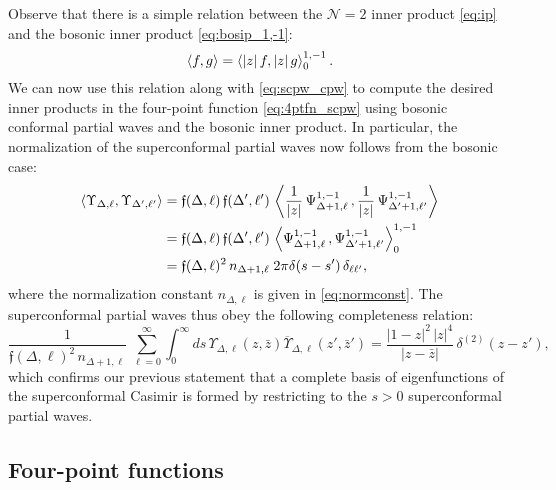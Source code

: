 \documentclass[11pt]{article}
\newcommand{\zb}{\bar{z}}
\begin{document}
Observe that there is a simple relation between the $\mathcal{N}=2$ inner product \eqref{eq:ip} and the bosonic inner product \eqref{eq:bosip_1,-1}:
%
\begin{equation}\label{eq:ipbos_rel}
\expval{ f,g } = \expval{ \abs{z}\, f, \abs{z}\, g }_{0}^{1,-1}.
\end{equation}
%
We can now use this relation along with \eqref{eq:scpw_cpw} to compute the desired inner products in the four-point function \eqref{eq:4ptfn_scpw} using bosonic conformal partial waves and the bosonic inner product. In particular, the normalization of the superconformal partial waves now follows from the bosonic case:
%
\begin{equation}\label{eq:scpw_norm}
\begin{split}
\expval{ \Upsilon_{\Delta,\ell},\Upsilon_{\Delta',\ell'} } 
&= 
	\mathfrak{f}(\Delta,\ell) \, \mathfrak{f}(\Delta',\ell') \, 
	\expval{ \frac{1}{\abs{z}} \, \Psi_{\Delta+1,\ell}^{1,-1}\,,\frac{1}{\abs{z}} \, \Psi_{\Delta'+1,\ell'}^{1,-1} } \\
	&= 
		\mathfrak{f}(\Delta,\ell)\, \mathfrak{f}(\Delta',\ell')\,
		\expval{ \Psi_{\Delta+1,\ell}^{1,-1}\,,\Psi_{\Delta'+1,\ell'}^{1,-1} }_{0}^{1,-1} \\
	&= \mathfrak{f}(\Delta,\ell)^{2} \, n_{\Delta+1,\ell} \;2\pi\delta(s-s')\, \delta_{\ell\ell'},
\end{split}
\end{equation}
%
where the normalization constant $n_{\Delta,\ell}$ is given in \eqref{eq:normconst}. The superconformal partial waves thus obey the following completeness relation:
%
\begin{equation}\label{eq:scpw_comp}
\frac{1}{\mathfrak{f}(\Delta,\ell)^{2}\, n_{\Delta+1,\ell}}\; \sum_{\ell=0}^{\infty}\int_{0}^{\infty} ds\,\Upsilon_{\Delta,\ell}(z,\zb)\overline{\Upsilon}_{\Delta,\ell}(z',\zb') = \frac{|1-z|^{2}\, |z|^{4}}{|z-\zb|}\, \delta^{(2)}(z-z'),
\end{equation}
%
which confirms our previous statement that a complete basis of eigenfunctions of the superconformal Casimir is formed by restricting to the $s>0$ superconformal partial waves.


\subsection{Four-point functions}
\label{sec:4ptfn}
\end{document}
